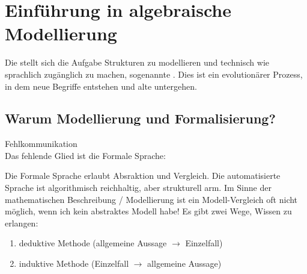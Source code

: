 
\section{Einführung in algebraische Modellierung}


Die  stellt sich die Aufgabe Strukturen zu modellieren und technisch wie sprachlich zugänglich zu machen, sogenannte .
Dies ist ein evolutionärer Prozess, in dem neue Begriffe entstehen und alte untergehen.

\subsection{Warum Modellierung und Formalisierung?}

\begin{figure}[H] %
	\begin{center}
		
	\end{center}
\end{figure}

 Fehlkommunikation\\
Das fehlende Glied ist die Formale Sprache:

\begin{figure}[H] %
	\begin{center}
		
	\end{center}
\end{figure}

Die Formale Sprache erlaubt Absraktion und Vergleich.
Die automatisierte Sprache ist algorithmisch reichhaltig, aber strukturell arm.
Im Sinne der mathematischen Beschreibung / Modellierung ist ein Modell-Vergleich oft nicht möglich, wenn ich kein abstraktes Modell habe!\nl
Es gibt zwei Wege, Wissen zu erlangen:
\begin{enumerate}
	\item {} deduktive Methode (allgemeine Aussage $\to$ Einzelfall)
	\item {} induktive Methode (Einzelfall $\to$ allgemeine Aussage)
\end{enumerate}

